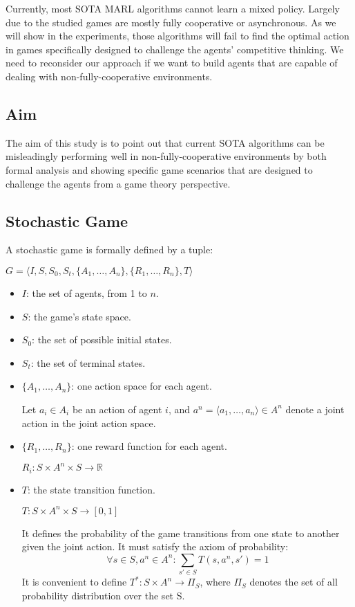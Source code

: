 \documentclass[a4paper]{article}
\begin{document}
\begin{multicols}{2}
Currently, most SOTA MARL algorithms cannot learn a mixed policy. Largely due to the studied games are mostly fully cooperative or asynchronous. As we will show in the experiments, those algorithms will fail to find the optimal action in games specifically designed to challenge the agents' competitive thinking. We need to reconsider our approach if we want to build agents that are capable of dealing with non-fully-cooperative environments.

\subsection{Aim}
The aim of this study is to point out that current SOTA algorithms can be misleadingly performing well in non-fully-cooperative environments by both formal analysis and showing specific game scenarios that are designed to challenge the agents from a game theory perspective.

\subsection{Stochastic Game}

A stochastic game is formally defined by a tuple:

$G = \langle I,S,S_0,S_t,\{A_1,\ldots,A_n\},\{R_1,\ldots,R_n\},T \rangle$
\begin{itemize}
    \item $I$: the set of agents, from 1 to \(n\).
    \item $S$: the game’s state space.
    \item $S_0$: the set of possible initial states.
    \item $S_t$: the set of terminal states.
    \item $\{A_1,\ldots,A_n\}$: one action space for each agent.

    Let $a_i \in A_i$ be an action of agent $i$, and $a^n=\langle a_1,\ldots,a_n \rangle \in A^n$ denote a joint action in the joint action space.
    \item $\{R_1,\ldots,R_n\}$: one reward function for each agent.

    $R_i:S \times A^n \times S \rightarrow \mathbb{R}$
    \item $T$: the state transition function.

    $T:S \times A^n \times S \rightarrow [0,1]$

    It defines the probability of the game transitions from one state to another given the joint action. It must satisfy the axiom of probability:
    \begin{equation}
    \forall s \in S,a^n \in A^n: \sum_{s' \in S}{T(s,a^n,s')}=1
    \label{eq:statetransition}
    \end{equation}
    It is convenient to define $T^*:S \times A^n \rightarrow \Pi_S$, where $\Pi_S$ denotes the set of all probability distribution over the set S.


\end{itemize}
\end{multicols}
\end{document}
